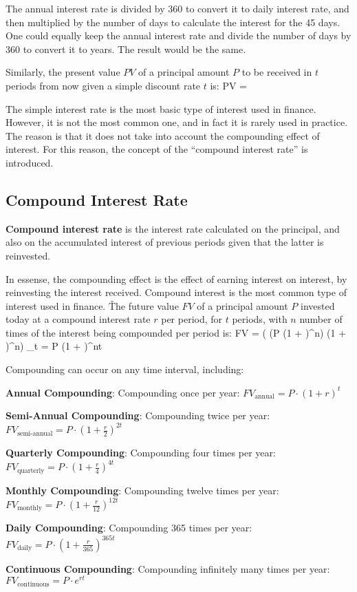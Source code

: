 The annual interest rate is divided by 360 to convert it to daily interest rate, and then multiplied by the number of
days to calculate the interest for the 45 days. One could equally keep the annual interest rate and divide the number
of days by 360 to convert it to years. The result would be the same.
\ee

Similarly, the present value $PV$ of a principal amount $P$ to be received in $t$ periods from now given a simple
discount rate $t$ is:
\bse
PV = 
\ese

The simple interest rate is the most basic type of interest used in finance. However, it is not the most common one,
and in fact it is rarely used in practice. The reason is that it does not take into account the compounding effect
of interest. For this reason, the concept of the ``compound interest rate'' is introduced.

\subsection{Compound Interest Rate}

\textbf{Compound interest rate} is the interest rate calculated on the principal, and also on the accumulated interest
of previous periods given that the latter is reinvested.
\ed

In essense, the compounding effect is the effect of earning interest on interest, by reinvesting the interest
received. Compound interest is the most common type of interest used in finance. \v

The future value $FV$ of a principal amount $P$ invested today at a compound interest rate $r$ per period, for $t$
periods, with $n$ number of times of the interest being compounded per period is:
\bse
FV = \biggl( \Bigl(P \cdot (1 + )^n\Bigr) \cdot (1 + )^n\biggr) \cdot \underbrace{\ldots}_{t} = P \cdot (1 + )^{nt}
\ese

Compounding can occur on any time interval, including:
\bit
\item \textbf{Annual Compounding}: Compounding once per year: $FV_{\text{annual}} = P \cdot \left(1 + r\right)^{t}$
\item \textbf{Semi-Annual Compounding}: Compounding twice per year: $FV_{\text{semi-annual}} = P \cdot \left(1 + \frac{r}{2}\right)^{2t}$
\item \textbf{Quarterly Compounding}: Compounding four times per year: $FV_{\text{quarterly}} = P \cdot \left(1 + \frac{r}{4}\right)^{4t}$
\item \textbf{Monthly Compounding}: Compounding twelve times per year: $FV_{\text{monthly}} = P \cdot \left(1 + \frac{r}{12}\right)^{12t}$
\item \textbf{Daily Compounding}: Compounding 365 times per year: $FV_{\text{daily}} = P \cdot \left(1 + \frac{r}{365}\right)^{365t}$
\item \textbf{Continuous Compounding}: Compounding infinitely many times per year: $FV_{\text{continuous}} = P \cdot e^{rt}$
\eit

